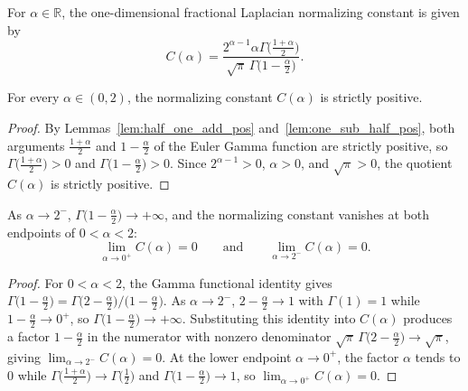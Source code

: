 \begin{definition}\label{def:frac_lap_constant}
\leanok
For $\alpha \in \mathbb{R}$, the one-dimensional fractional Laplacian normalizing constant is given by
\[
  C(\alpha) = \frac{2^{\alpha - 1} \alpha \Gamma\bigl(\frac{1 + \alpha}{2}\bigr)}{\sqrt{\pi}\, \Gamma\bigl(1 - \frac{\alpha}{2}\bigr)}.
\]
\end{definition}

\begin{theorem}\label{thm:frac_lap_constant_pos}
\leanok
For every $\alpha \in (0, 2)$, the normalizing constant $C(\alpha)$ is strictly positive.
\end{theorem}

\begin{proof}
\leanok
By Lemmas~\ref{lem:half_one_add_pos} and~\ref{lem:one_sub_half_pos}, both arguments $\frac{1+\alpha}{2}$ and $1 - \frac{\alpha}{2}$ of the Euler Gamma function are strictly positive, so $\Gamma\bigl(\frac{1+\alpha}{2}\bigr) > 0$ and $\Gamma\bigl(1 - \frac{\alpha}{2}\bigr) > 0$. Since $2^{\alpha-1} > 0$, $\alpha > 0$, and $\sqrt{\pi} > 0$, the quotient $C(\alpha)$ is strictly positive.
\end{proof}

\begin{theorem}\label{thm:frac_lap_constant_limits}
\leanok
As $\alpha \to 2^-$, $\Gamma\bigl(1 - \frac{\alpha}{2}\bigr) \to +\infty$, and the normalizing constant vanishes at both endpoints of $0 < \alpha < 2$:
\[
  \lim_{\alpha \to 0^+} C(\alpha) = 0 \qquad \text{and} \qquad \lim_{\alpha \to 2^-} C(\alpha) = 0.
\]
\end{theorem}

\begin{proof}
\leanok
For $0 < \alpha < 2$, the Gamma functional identity gives $\Gamma\bigl(1 - \frac{\alpha}{2}\bigr) = \Gamma\bigl(2 - \frac{\alpha}{2}\bigr) / \bigl(1 - \frac{\alpha}{2}\bigr)$. As $\alpha \to 2^-$, $2 - \frac{\alpha}{2} \to 1$ with $\Gamma(1) = 1$ while $1 - \frac{\alpha}{2} \to 0^+$, so $\Gamma\bigl(1 - \frac{\alpha}{2}\bigr) \to +\infty$. Substituting this identity into $C(\alpha)$ produces a factor $1 - \frac{\alpha}{2}$ in the numerator with nonzero denominator $\sqrt{\pi}\,\Gamma\bigl(2 - \frac{\alpha}{2}\bigr) \to \sqrt{\pi}$, giving $\lim_{\alpha \to 2^-} C(\alpha) = 0$. At the lower endpoint $\alpha \to 0^+$, the factor $\alpha$ tends to $0$ while $\Gamma\bigl(\frac{1+\alpha}{2}\bigr) \to \Gamma\bigl(\frac{1}{2}\bigr)$ and $\Gamma\bigl(1 - \frac{\alpha}{2}\bigr) \to 1$, so $\lim_{\alpha \to 0^+} C(\alpha) = 0$.
\end{proof}

